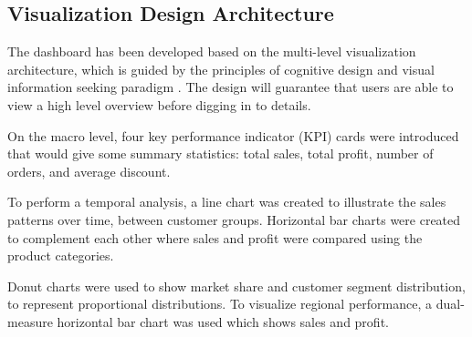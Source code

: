 \documentclass[conference]{IEEEtran}
\begin{document}
\subsection{Visualization Design Architecture}

The dashboard has been developed based on the multi-level visualization architecture, which is guided by the principles of cognitive design and visual information seeking paradigm \cite{shneiderman1996eyes}. The design will guarantee that users are able to view a high level overview before digging in to details.

On the macro level, four key performance indicator (KPI) cards were introduced that would give some summary statistics: total sales, total profit, number of orders, and average discount.

To perform a temporal analysis, a line chart was created to illustrate the sales patterns over time, between customer groups. Horizontal bar charts were created to complement each other where sales and profit were compared using the product categories.

Donut charts were used to show market share and customer segment distribution, to represent proportional distributions. To visualize regional performance, a dual-measure horizontal bar chart was used which shows sales and profit.
\end{document}
